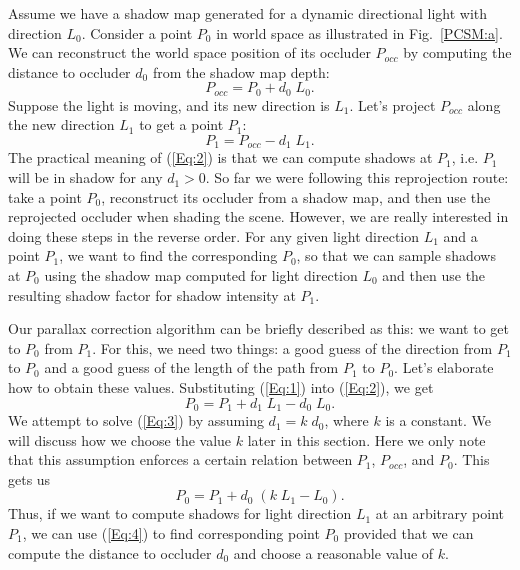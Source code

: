 Assume we have a shadow map generated for a dynamic directional light with 
direction $L_0$. Consider a point $P_0$ in world space as illustrated in 
Fig.~\ref{PCSM:a}. We can reconstruct the world space position of its occluder 
$P_{occ}$ by computing the distance to occluder $d_0$ from the shadow map depth:
\begin{equation}\label{Eq:1}
P_{occ} = P_0 + d_0\;L_0.
\end{equation}
Suppose the light is moving, and its new direction is $L_1$. Let's project
$P_{occ}$ along the new direction $L_1$ to get a point $P_1$:
\begin{equation}\label{Eq:2}
P_1 = P_{occ} - d_1\;L_1.
\end{equation}
The practical meaning of (\ref{Eq:2}) is that we can compute shadows at 
$P_1$, i.e. $P_1$ will be in shadow for any $d_1 > 0$. So far we were following
this reprojection route: take a point $P_0$, reconstruct its occluder from 
a shadow map, and then use the reprojected occluder when shading the scene. However, 
we are really interested in doing these steps in the reverse order. For any 
given light direction $L_1$ and a point $P_1$, we want to find the corresponding
$P_0$, so that we can sample shadows at $P_0$ using the shadow map computed for 
light direction $L_0$ and then use the resulting shadow factor for shadow
intensity at $P_1$.

Our parallax correction algorithm can be briefly described as this: we want 
to get to $P_0$ from $P_1$. For this, we need two things: a good guess of the 
direction from $P_1$ to $P_0$ and a good guess of the length of the path from
$P_1$ to $P_0$. Let's elaborate how to obtain these values. Substituting 
(\ref{Eq:1}) into (\ref{Eq:2}), we get
\begin{equation}\label{Eq:3}
P_0 = P_1 + d_1\;L_1 - d_0\;L_0.
\end{equation}
We attempt to solve (\ref{Eq:3}) by assuming $d_1 = k\;d_0$, where $k$ is
a constant. We will discuss how we choose the value $k$ later in this section.
Here we only note that this assumption enforces a certain relation between 
$P_1$, $P_{occ}$, and $P_0$. This gets us
\begin{equation}\label{Eq:4}
P_0 = P_1 + d_0\;( k\;L_1 - L_0 ).
\end{equation}
Thus, if we want to compute shadows for light direction $L_1$ at an arbitrary
point $P_1$, we can use (\ref{Eq:4}) to find corresponding point $P_0$
provided that we can compute the distance to occluder $d_0$ and choose 
a reasonable value of $k$. 

